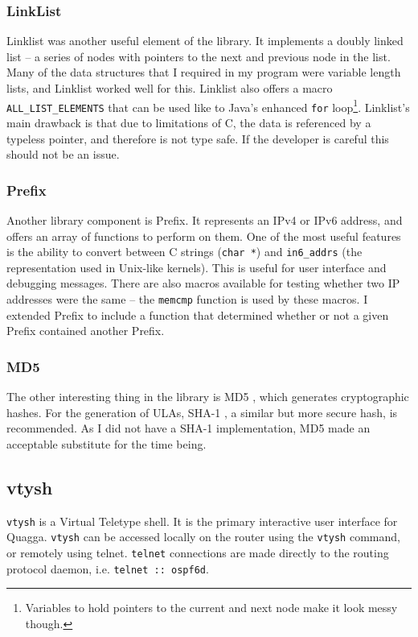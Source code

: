 \documentclass[12pt]{report}
\begin{document}
\subsubsection{LinkList}
Linklist was another useful element of the library. It implements a doubly
linked list -- a series of nodes with pointers to the next and previous node in
the list. Many of the data structures that I required in my program were
variable length lists, and Linklist worked well for this. Linklist also offers
a macro \texttt{ALL\_LIST\_ELEMENTS} that can be used like to Java's enhanced
\texttt{for} loop\footnote{Variables to hold pointers to the current and next
node make it look messy though.}. Linklist's main drawback is that due to
limitations of C, the data is referenced by a typeless pointer, and therefore
is not type safe. If the developer is careful this should not be an issue. 

\subsubsection{Prefix}
Another library component is Prefix. It represents an IPv4 or IPv6 address, and
offers an array of functions to perform on them. One of the most
useful features is the ability to convert between C strings
(\texttt{char *}) and \texttt{in6\_addrs} (the representation used in Unix-like
kernels). This is useful for user interface and debugging messages.
There are also macros available for testing whether two IP addresses were the
same -- the \texttt{memcmp} function is used by these macros. I extended Prefix
to include a function that determined whether or not a given Prefix contained
another Prefix.

\subsubsection{MD5}
The other interesting thing in the library is MD5
, which generates cryptographic
hashes. For the generation of ULAs, SHA-1 , a similar but more secure hash, is recommended. As I did not have
a SHA-1 implementation, MD5 made an acceptable substitute for the time being. 

\subsection{vtysh}
\texttt{vtysh}  is a
Virtual Teletype shell. It is the primary interactive user interface for
Quagga. \texttt{vtysh} can be accessed locally on the router using the
\texttt{vtysh} command, or remotely using telnet. \texttt{telnet} connections
are made directly to the routing protocol daemon, i.e. \texttt{telnet ::
ospf6d}.  
\end{document}
